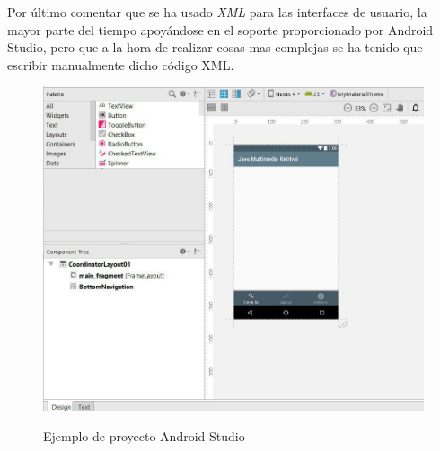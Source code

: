 Por último comentar que se ha usado \textit{XML} para las interfaces de usuario, la mayor parte del tiempo apoyándose en el soporte proporcionado por Android Studio, pero que a la hora de realizar cosas mas complejas se ha tenido que escribir manualmente dicho código XML.

\begin{figure}[H] %
\centering
\includegraphics[scale=0.6]{imagenes/interfaz-android-studio.jpg}  %
\label{interfaz-android-studio.jpg}
\caption{Ejemplo de proyecto Android Studio}
\end{figure}


